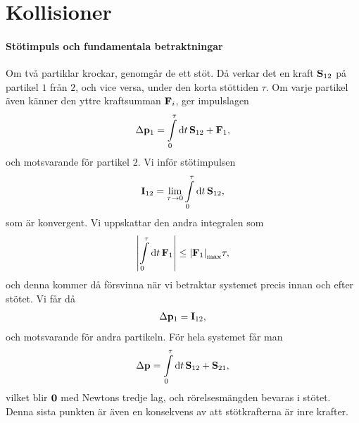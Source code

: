\section{Kollisioner}

\paragraph{Stötimpuls och fundamentala betraktningar}
Om två partiklar krockar, genomgår de ett stöt. Då verkar det en kraft $\vb{S}_{12}$ på partikel $1$ från $2$, och vice versa, under den korta stöttiden $\tau$. Om varje partikel även känner den yttre kraftsumman $\vb{F}_{i}$, ger impulslagen
\begin{align*}
	\Delta\vb{p}_{1} = \int\limits_{0}^{\tau}\dd{t}\vb{S}_{12} + \vb{F}_{1},
\end{align*}
och motsvarande för partikel $2$. Vi inför stötimpulsen
\begin{align*}
	\vb{I}_{12} = \lim\limits_{\tau\to 0}\int\limits_{0}^{\tau}\dd{t}\vb{S}_{12},
\end{align*}
som är konvergent. Vi uppskattar den andra integralen som
\begin{align*}
	\abs{\int\limits_{0}^{\tau}\dd{t}\vb{F}_{1}}\leq\abs{\vb{F}_{1}}_{\text{max}}\tau,
\end{align*}
och denna kommer då försvinna när vi betraktar systemet precis innan och efter stötet. Vi får då
\begin{align*}
	\Delta\vb{p}_{1} = \vb{I}_{12},
\end{align*}
och motsvarande för andra partikeln. För hela systemet får man
\begin{align*}
	\Delta\vb{p} = \int\limits_{0}^{\tau}\dd{t}\vb{S}_{12} + \vb{S}_{21},
\end{align*}
vilket blir $\vb{0}$ med Newtons tredje lag, och rörelsesmängden bevaras i stötet. Denna sista punkten är även en konsekvens av att stötkrafterna är inre krafter.


